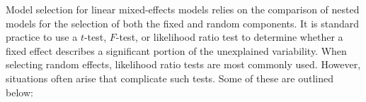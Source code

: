 \documentclass[12pt]{article}
\newcommand{\hh}[1]{{\color{orange} #1}}
\newcommand{\alnote}[1]{\todo[inline,color=green!40]{#1}} %
\begin{document}
 Model selection for linear mixed-effects models relies on the comparison of nested models for the selection of both the fixed and random components. 
It is standard practice to use a $t$-test, $F$-test, or likelihood ratio test to determine whether a fixed effect describes a significant portion of the unexplained variability. %
When selecting random effects, likelihood ratio tests are most commonly used. 
However, situations often arise that complicate such tests. 
Some of these are outlined below:
\end{document}
